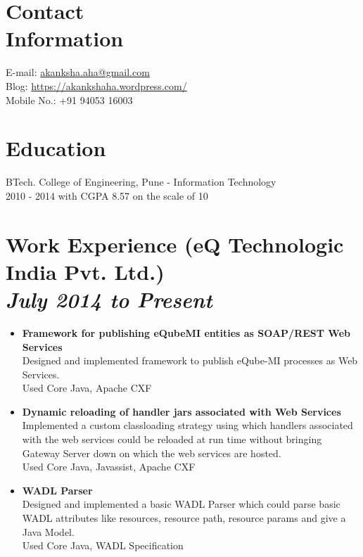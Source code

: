 \documentclass[margin,line]{res}
\begin{document}

\begin{resume}

\section{Contact\\Information}  
E-mail: \href{mailto:akanksha.aha@gmail.com}{akanksha.aha@gmail.com}\\
Blog: \url{https://akankshaha.wordpress.com/}\\
Mobile No.: +91 94053 16003

\section{Education}
BTech. College of Engineering, Pune - Information Technology\\
2010 - 2014 with CGPA 8.57 on the scale of 10

\section{Work Experience (eQ Technologic India Pvt. Ltd.)\\
\emph {July 2014 to Present}}
\begin{itemize} \itemsep -4pt

\item \textbf{Framework for publishing eQubeMI entities as SOAP/REST Web\\ Services}\\
Designed and implemented framework to publish eQube-MI processes as Web Services.\\
Used Core Java, Apache CXF\\

\item \textbf{Dynamic reloading of handler jars associated with Web Services}\\
Implemented a custom classloading strategy using which handlers associated with the web services could be reloaded at run time without bringing Gateway Server down on which the web services are hosted. \\
Used Core Java, Javassist, Apache CXF\\

\item \textbf{WADL Parser}\\
Designed and implemented a basic WADL Parser which could parse basic WADL attributes like resources, resource path, resource params and give a Java Model.\\
Used Core Java, WADL Specification\\


\end{itemize}
\end{resume}
\end{document}
